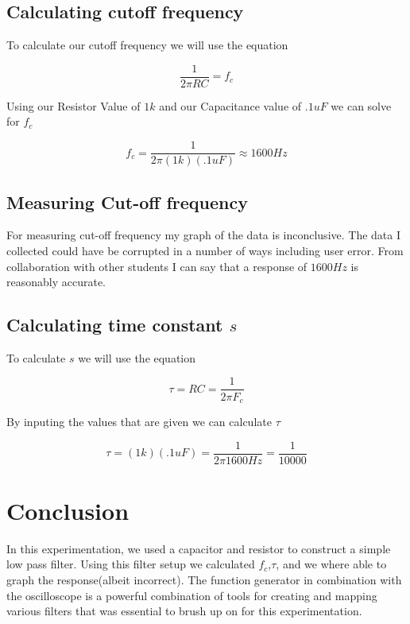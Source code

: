 \documentclass[12pt]{article}
\begin{document}
\subsection{Calculating cutoff frequency}

To calculate our cutoff frequency we will use the equation

$$\frac{1}{2\pi RC} = f_c$$

Using our Resistor Value of $1k$ and our Capacitance value of $.1uF$
we can solve for $f_c$

$$f_c = \frac{1}{2 \pi (1k)(.1uF)}\approx 1600Hz$$





\subsection{Measuring Cut-off frequency}

For measuring cut-off frequency my graph of the data is inconclusive. The data I collected could have be corrupted in a number of ways including user error. From collaboration with other students I can say that a response of $1600Hz$ is reasonably accurate.
\newpage
\subsection{Calculating time constant $s$}

To calculate $s$ we will use the equation

$$\tau = RC = \frac{1}{2\pi F_c}$$

By inputing the values that are given we can calculate $\tau$

$$\tau = (1k)(.1uF) = \frac{1}{2\pi 1600Hz} = \frac{1}{10000}$$

\section{Conclusion}

In this experimentation, we used a capacitor and resistor to construct a simple low pass filter. Using this filter setup we calculated $f_c$,$\tau$, and we where able to graph the response(albeit incorrect). The function generator in combination with the oscilloscope is a powerful combination of tools for creating and mapping various filters that was essential to brush up on for this experimentation. 
\end{document}
